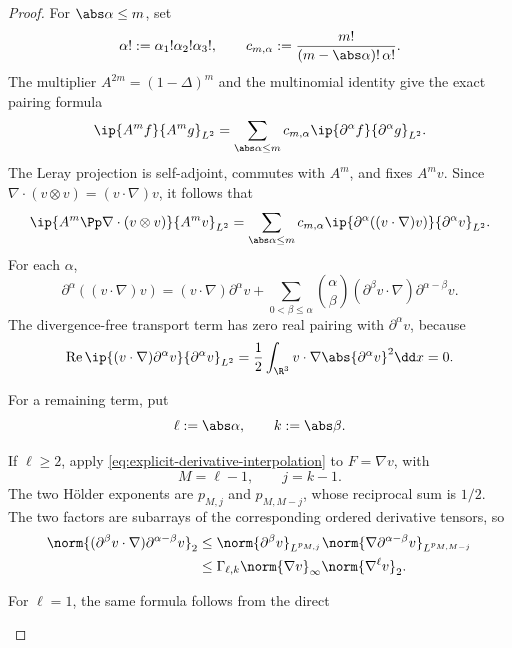 \begin{proof}
For \(\abs\alpha\le m\), set
\[
 \alpha!:=\alpha_1!\alpha_2!\alpha_3!,
 \qquad
 c_{m,\alpha}:=\frac{m!}{(m-\abs\alpha)!\,\alpha!}.
\]
The multiplier \(A^{2m}=(1-\Delta)^m\) and the multinomial identity give the
exact pairing formula
\begin{equation}
 \ip{A^mf}{A^mg}_{L^2}
 =\sum_{\abs\alpha\le m}c_{m,\alpha}
   \ip{\partial^\alpha f}{\partial^\alpha g}_{L^2}.
 \label{eq:integer-Am-pairing}
\end{equation}
The Leray projection is self-adjoint, commutes with \(A^m\), and fixes
\(A^mv\).  Since
\(\nabla\cdot(v\otimes v)=(v\cdot\nabla)v\), it follows that
\begin{equation}
 \ip{A^m\Pp\nabla\cdot(v\otimes v)}{A^mv}_{L^2}
 =\sum_{\abs\alpha\le m}c_{m,\alpha}
   \ip{\partial^\alpha((v\cdot\nabla)v)}
      {\partial^\alpha v}_{L^2}.
 \label{eq:integer-projected-pairing}
\end{equation}
For each \(\alpha\),
\[
 \partial^\alpha((v\cdot\nabla)v)
 =(v\cdot\nabla)\partial^\alpha v
 +\sum_{0<\beta\le\alpha}\binom\alpha\beta
 (\partial^\beta v\cdot\nabla)
 \partial^{\alpha-\beta}v.
\]
The divergence-free transport term has zero real pairing with
\(\partial^\alpha v\), because
\[
 \operatorname{Re}\ip{(v\cdot\nabla)\partial^\alpha v}
 {\partial^\alpha v}_{L^2}
 =\frac12\int_{\R^3}v\cdot\nabla
   \abs{\partial^\alpha v}^2\dd x=0.
\]
\begin{samepage}
For a remaining term, put
\[
 \ell:=\abs\alpha,
 \qquad k:=\abs\beta.
\]
\par
\end{samepage}
\begin{samepage}
If \(\ell\ge2\), apply
\eqref{eq:explicit-derivative-interpolation} to \(F=\nabla v\), with
\[
 M=\ell-1,
 \qquad j=k-1.
\]
The two H\"older exponents are \(p_{M,j}\) and \(p_{M,M-j}\), whose
reciprocal sum is \(1/2\).  The two factors are subarrays of the corresponding
ordered derivative tensors, so
\begin{align}
 \norm{(\partial^\beta v\cdot\nabla)
          \partial^{\alpha-\beta}v}_2
 &\le
 \norm{\partial^\beta v}_{L^{p_{M,j}}}
 \norm{\nabla\partial^{\alpha-\beta}v}_{L^{p_{M,M-j}}}\notag\\
 &\le\Gamma_{\ell,k}\norm{\nabla v}_\infty
       \norm{\nabla^\ell v}_2.
 \label{eq:explicit-commutator-product}
\end{align}
\par
\end{samepage}
\begin{samepage}
For \(\ell=1\), the same formula follows from the direct

\end{samepage}
\end{proof}
